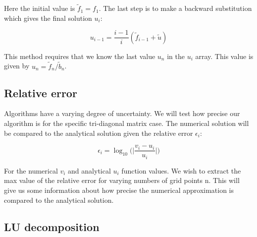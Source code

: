 \documentclass[norsk,a4paper,12pt]{article}
\begin{document}
Here the initial value is $\tilde{f}_1=f_1$. The last step is to make a backward substitution which gives the final solution $u_i$:

\begin{equation}
u_{i-1}=\frac{i-1}{i}(\tilde{f}_{i-1}+\tilde{u})
 \label{eq:u_i-1}
 \end{equation}
 
 This method requires that we know the last value $u_n$ in the $u_i$ array. This value is given by $u_n=\tilde{f}_n/\tilde{b}_n$. 
 
 \subsection{Relative error}
 
 Algorithms have a varying degree of uncertainty. We will test how precise our algorithm is for the specific tri-diagonal matrix case. The numerical solution will be compared to the analytical solution given the relative error $\epsilon_i$:
 
 \begin{equation}
\epsilon_i = \log_{10}\bigg(\bigg|\frac{v_i-u_i}{u_i}\bigg|\bigg)
 \label{eq:eps}
 \end{equation}
 
For the numerical $v_i$ and analytical $u_i$ function values. We wish to extract the max value of the relative error for varying numbers of grid points n. This will give us some information about how precise the numerical approximation is compared to the analytical solution.

 \subsection{LU decomposition}
\end{document}
